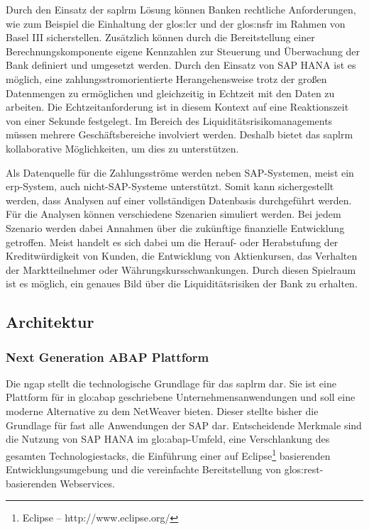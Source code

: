 \begin{onehalfspacing}
Durch den Einsatz der \gls{saplrm} Lösung können Banken rechtliche Anforderungen, wie zum Beispiel die Einhaltung der \gls{glos:lcr} und der \gls{glos:nsfr} im Rahmen von Basel III sicherstellen. Zusätzlich können durch die Bereitstellung einer Berechnungskomponente eigene Kennzahlen zur Steuerung und Überwachung der Bank definiert und umgesetzt werden. Durch den Einsatz von SAP HANA ist es möglich, eine zahlungsstromorientierte Herangehensweise trotz der großen Datenmengen zu ermöglichen und gleichzeitig in Echtzeit mit den Daten zu arbeiten. Die Echtzeitanforderung ist in diesem Kontext auf eine Reaktionszeit von einer Sekunde festgelegt. Im Bereich des Liquiditätsrisikomanagements müssen mehrere Geschäftsbereiche involviert werden. Deshalb bietet das \gls{saplrm} kollaborative Möglichkeiten, um dies zu unterstützen.

Als Datenquelle für die Zahlungsströme werden neben SAP-Systemen, meist ein \gls{erp}-System, auch nicht-SAP-Systeme unterstützt. Somit kann sichergestellt werden, dass Analysen auf einer vollständigen Datenbasis durchgeführt werden. Für die Analysen können verschiedene Szenarien simuliert werden. Bei jedem Szenario werden dabei Annahmen über die zukünftige finanzielle Entwicklung getroffen. Meist handelt es sich dabei um die Herauf- oder Herabstufung der Kreditwürdigkeit von Kunden, die Entwicklung von Aktienkursen, das Verhalten der Marktteilnehmer oder Währungskursschwankungen. Durch diesen Spielraum ist es möglich, ein genaues Bild über die Liquiditätsrisiken der Bank zu erhalten.


\subsection{Architektur}

\subsubsection{Next Generation ABAP Plattform}
Die \gls{ngap} stellt die technologische Grundlage für das \gls{saplrm} dar. Sie ist eine Plattform für in \gls{glo:abap} geschriebene Unternehmensanwendungen und soll eine moderne Alternative zu dem \gls{NetWeaver} bieten. Dieser stellte bisher die Grundlage für fast alle Anwendungen der SAP dar. Entscheidende Merkmale sind die Nutzung von SAP HANA im \gls{glo:abap}-Umfeld, eine Verschlankung des gesamten Technologiestacks, die Einführung einer auf Eclipse\footnote{Eclipse -- http://www.eclipse.org/} basierenden Entwicklungsumgebung und die vereinfachte Bereitstellung von \gls{glos:rest}-basierenden Webservices.


\end{onehalfspacing}
